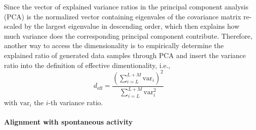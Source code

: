 \documentclass[11pt]{article}
\begin{document}
	Since the vector of explained variance ratios in the principal component analysis (PCA) is the normalized vector containing eigenvales of the covariance matrix re-scaled by the largest eigenvalue in descending order, which then explains how much variance does the corresponding principal component contribute. Therefore, another way to access the dimensionality is to empirically determine the explained ratio of generated data samples through PCA and insert the variance ratio into the definition of effective dimentionality, i.e.,
		\begin{equation} \label{eq:dim_empirical_sym}
			d_{\text{eff}} = \frac{\left(\sum_{i=L}^{L+M}\text{var}_i\right)^2}{\sum_{i=L}^{L+M}\text{var}_i^2} 
		\end{equation}
	with $\text{var}_i$ the $i$-th variance ratio. 
	
	\paragraph{Alignment with spontaneous activity}
	
\end{document}
